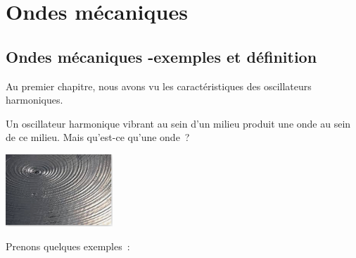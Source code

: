 
\section{Ondes mécaniques}

\subsection{Ondes mécaniques -exemples et définition }

Au premier chapitre, nous avons vu les caractéristiques des oscillateurs
harmoniques.

Un oscillateur harmonique vibrant au sein d'un milieu produit une onde
au sein de ce milieu. Mais qu'est-ce qu'une onde~?

\includegraphics[width=4.032cm,height=2.711cm]{Pictures/1000000100000110000000B7020F4AB269606603.png}

Prenons quelques exemples~:


